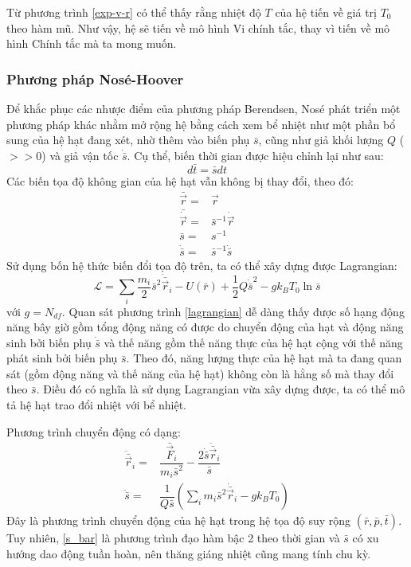 \documentclass[12pt,a4paper,reqno, oneside]{book}
\begin{document}
			Từ phương trình \eqref{exp-v-r} có thể thấy rằng nhiệt độ $T$ của hệ tiến về giá trị $T_{0}$ theo hàm mũ. Như vậy, hệ sẽ tiến về mô hình Vi chính tắc, thay vì tiến về mô hình Chính tắc mà ta mong muốn.
		\subsubsection{Phương pháp Nosé-Hoover}
		
			Để khắc phục các nhược điểm của phương pháp Berendsen, Nosé phát triển một phương pháp khác nhằm mở rộng hệ bằng cách xem bể nhiệt như một phần bổ sung của hệ hạt đang xét, nhờ thêm vào biến phụ $\bar{s}$, cũng như giả khối lượng $Q$ ($>>0$) và giả vận tốc $\dot{\bar{s}}$. Cụ thể, biến thời gian được hiệu chỉnh lại như sau:
			\begin{equation}
			d\bar{t}=\bar{s} dt
			\end{equation}
			Các biến tọa độ không gian của hệ hạt vẫn không bị thay đổi, theo đó:
			\begin{align}
			\bar{\vec{r}} = & \vec{r}\\
			\bar{\dot{\vec{r}}} = & \bar{s}^{-1}\dot{\vec{r}}\\
			\bar{s} = & s^{-1}\\
			\dot{\bar{s}} = & \bar{s}^{-1}\dot{\bar{s}}
			\end{align}
			Sử dụng bốn hệ thức biến đổi tọa độ trên, ta có thể xây dựng được Lagrangian:
			\begin{equation}
			\mathcal{L}=\sum_{i} \dfrac{m_{i}}{2}\bar{s}^{2}\dot{\bar{\vec{r}}}_{i} - U\left(\bar{r}\right) + \dfrac{1}{2}Q\dot{\bar{s}}^{2} - gk_{B}T_{0}\ln \bar{s}
			\label{lagrangian}
			\end{equation}
			với $g=N_{df}$.
			Quan sát phương trình \eqref{lagrangian} dễ dàng thấy được số hạng động năng bây giờ gồm tổng động năng có được do chuyển động của hạt và động năng sinh bởi biến phụ $\dot{\bar{s}}$ và thế năng gồm thế năng thực của hệ hạt cộng với thế năng phát sinh bởi biến phụ $\bar{s}$. Theo đó, năng lượng thực của hệ hạt mà ta đang quan sát (gồm động năng và thế năng của hệ hạt) không còn là hằng số mà thay đổi theo $\bar{s}$. Điều đó có nghĩa là sử dụng Lagrangian vừa xây dựng được, ta có thể mô tả hệ hạt trao đổi nhiệt với bể nhiệt.
			
			Phương trình chuyển động có dạng:
			\begin{eqnarray}
			\label{r_bar}
			\ddot{\bar{\vec{r}}}_{i} = & \dfrac{\bar{\vec{F}}_{i}}{m_{i}\bar{s}^{2}} - \dfrac{2\dot{\bar{s}}\dot{\bar{\vec{r}}}_{i}}{\bar{s}}\\
			\ddot{\bar{s}} = & \dfrac{1}{Q\bar{s}}\left( \sum_{i}m_{i}\bar{s}^{2}\dot{\bar{\vec{r}}}_{i} - gk_{B}T_{0} \right)
			\label{s_bar}
			\end{eqnarray}
			Đây là phương trình chuyển động của hệ hạt trong hệ tọa độ suy rộng $\left( \bar{r},\bar{p},\bar{t} \right)$. Tuy nhiên, \eqref{s_bar} là phương trình đạo hàm bậc 2 theo thời gian và $\bar{s}$ có xu hướng dao động tuần hoàn, nên thăng giáng nhiệt cũng mang tính chu kỳ.
			
\end{document}
